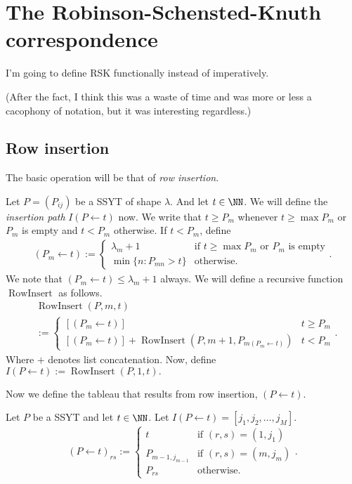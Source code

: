 \documentclass{article}
\DeclareMathOperator{\RowInsert}{RowInsert}
\begin{document}
\section{The Robinson-Schensted-Knuth correspondence}

I'm going to define RSK functionally instead of imperatively. 

(After the fact, I think this was a waste of time and was more or less a cacophony of notation, but it was interesting regardless.)

\subsection{Row insertion}

The basic operation will be that of \textit{row insertion}.

\begin{definition}
    Let $P = (P_{ij})$ be a SSYT of shape $\lambda$. And let $t \in \NN$. We will define the \textit{insertion path} $I(P\leftarrow t)$ now.
    We write that $t \geq P_m$ whenever $t \geq \max P_m$ or $P_m$ is empty and $t < P_m$ otherwise. 
    If $t < P_m$, define
    \begin{align*}
        (P_m \leftarrow t) := \begin{cases}
            \lambda_m + 1 & \text{if $t \geq \max P_m$ or $P_m$ is empty} \\
            \min\{n:P_{mn} > t\} & \text{otherwise}.
        \end{cases}.
    \end{align*}
    We note that $(P_m \leftarrow t) \leq \lambda_m + 1$ always.
    We will define a recursive function $\RowInsert$ as follows.
    \begin{align*}
        &\RowInsert(P,m,t) \\
        &:= \begin{cases}
            [(P_m \leftarrow t)] & t \geq P_m \\
            [(P_m \leftarrow t)] + \RowInsert(P, m+1, P_{m(P_m \leftarrow t)}) & t < P_m
        \end{cases}.
    \end{align*}
    Where $+$ denotes list concatenation.
    Now, define $I(P\leftarrow t) := \RowInsert(P,1,t).$
\end{definition}

Now we define the tableau that results from row insertion, $(P \leftarrow t)$.

\begin{definition}
    Let $P$ be a SSYT and let $t \in \NN$. Let $I(P \leftarrow t) = [j_1, j_2, \ldots, j_M]$.
    \[
        (P \leftarrow t)_{rs} := \begin{cases}
            t & \text{if } (r,s) = (1, j_1) \\
            P_{m-1,j_{m-1}} & \text{if }(r,s) = (m, j_m) \\
            P_{rs} & \text{otherwise}.
        \end{cases}.
    \]
\end{definition}
\end{document}
